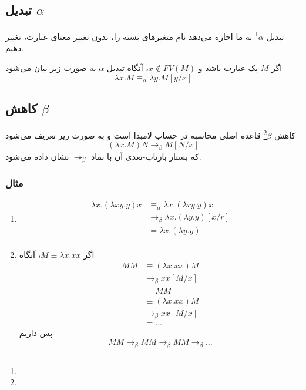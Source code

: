 \subsection*{تبدیل $\alpha$}

تبدیل
$\alpha$\footnote{}
به ما اجازه می‌دهد نام متغیرهای بسته را، بدون تغییر معنای عبارت، تغییر دهیم.

\begin{defn}
اگر
$M$
یک عبارت باشد و
$x \notin FV(M)$،
آنگاه تبدیل
$\alpha$
به صورت زیر بیان می‌شود
\begin{equation*}
\lambda x.M \equiv_{\alpha} \lambda y.M[y/x]
\end{equation*}
\end{defn}

\subsection*{کاهش $\beta$}

\begin{defn}
کاهش
$\beta$\footnote{}
قاعده اصلی محاسبه در حساب لامبدا است و به صورت زیر تعریف می‌شود
\begin{equation*}
(\lambda x.M)N \rightarrow_{\beta} M[N/x]
\end{equation*}
که بستار بازتاب-تعدی آن با نماد
$\twoheadrightarrow_{\beta}$
نشان داده می‌شود.
\end{defn}

\subsubsection{مثال}
\begin{enumerate}
\item
\begin{align*}
\lambda x.(\lambda xy.y)x &\equiv_{\alpha} \lambda x.(\lambda ry.y)x\\
&\rightarrow_{\beta} \lambda x.(\lambda y.y)[x/r]\\
&= \lambda x.(\lambda y.y)\\
\end{align*}
\item \label{infinite_reduction} اگر $M \equiv \lambda x.xx$، آنگاه
\begin{align*}
MM &\equiv (\lambda x.xx)M\\
&\rightarrow_{\beta} xx[M/x]\\
&= MM\\
&\equiv (\lambda x.xx)M\\
&\rightarrow_{\beta} xx[M/x]\\
&= \dots
\end{align*}
پس داریم
\begin{equation*}
MM \rightarrow_{\beta} MM \rightarrow_{\beta} MM \rightarrow_{\beta} \dots
\end{equation*}
\end{enumerate}

